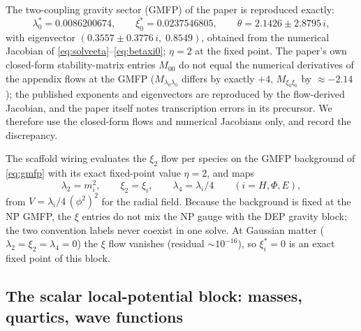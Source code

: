\documentclass[11pt]{article}
\newcommand{\lfour}{\lambda_4}
\begin{document}
The two-coupling gravity sector (GMFP) of the paper is reproduced exactly:
\begin{equation}
  \label{eq:gmfp}
  \lambda_0^*=0.0086200674,\qquad \xi_0^*=0.0237546805,\qquad
  \theta=2.1426\pm 2.8795\,i,
\end{equation}
with eigenvector $(0.3557\pm 0.3776\,i,\;0.8549)$, obtained from the numerical
Jacobian of \eqref{eq:solveeta}--\eqref{eq:betaxi0}; $\eta=2$ at the fixed
point.  The paper's own closed-form stability-matrix entries $M_{00}$ do not
equal the numerical derivatives of the appendix flows at the GMFP
($M_{\lambda_0\lambda_0}$ differs by exactly $+4$, $M_{\xi_0\xi_0}$ by
$\approx-2.14$); the published exponents and eigenvectors are reproduced by
the flow-derived Jacobian, and the paper itself notes transcription errors in
its precursor.  We therefore use the closed-form flows and numerical
Jacobians only, and record the discrepancy.

The scaffold wiring evaluates the $\xi_2$ flow per species on the GMFP
background of \eqref{eq:gmfp} with its exact fixed-point value $\eta=2$, and
maps
\begin{equation}
  \label{eq:npwiring}
  \lambda_2=m_i^2,\qquad \xi_2=\xi_i,\qquad
  \lambda_4=\lambda_i/4
  \qquad(i=H,\Phi,E),
\end{equation}
from $V=\lambda_i/4\,(\phi^2)^2$ for the radial field.  Because the
background is fixed at the NP GMFP, the $\xi$ entries do not mix the NP gauge
with the DEP gravity block; the two convention labels never coexist in one
solve.  At Gaussian matter ($\lambda_2=\xi_2=\lfour=0$) the $\xi$ flow
vanishes (residual $\sim 10^{-16}$), so $\xi_i^*=0$ is an exact fixed point of
this block.

\subsection{The scalar local-potential block: masses, quartics, wave
functions}
\label{sec:lpa}
\end{document}
